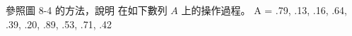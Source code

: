 \startEXERCISE
參照圖 8-4 的方法，說明  在如下數列 $A$ 上的操作過程。
\startformula
A = \langle .79, .13, .16, .64, .39, .20, .89, .53, .71, .42 \rangle
\stopformula
\stopEXERCISE

\startANSWER
\externalfigure[output/e8_4_1-1]
\stopANSWER
